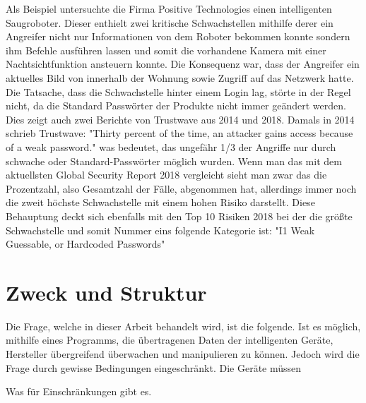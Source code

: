 Als Beispiel untersuchte die Firma Positive Technologies einen intelligenten Saugroboter.
Dieser enthielt zwei kritische Schwachstellen mithilfe derer ein Angreifer nicht nur Informationen von dem Roboter bekommen konnte sondern ihm Befehle ausführen lassen und somit die vorhandene Kamera mit einer Nachtsichtfunktion ansteuern konnte. Die Konsequenz war, dass der Angreifer ein aktuelles Bild von innerhalb der Wohnung sowie Zugriff auf das Netzwerk hatte. Die Tatsache, dass die Schwachstelle hinter einem Login lag, störte in der Regel nicht, da die Standard Passwörter der Produkte nicht immer geändert werden.
Dies zeigt auch zwei Berichte von Trustwave aus 2014 und 2018.
Damals in 2014 schrieb Trustwave: "Thirty percent of the time, an attacker gains access because of a weak password."
was bedeutet, das ungefähr 1/3 der Angriffe nur durch schwache oder Standard-Passwörter möglich wurden. Wenn man das mit dem aktuellsten Global Security Report 2018 vergleicht sieht man zwar das die Prozentzahl, also Gesamtzahl der Fälle, abgenommen hat, allerdings immer noch die zweit höchste Schwachstelle mit einem hohen Risiko darstellt.
Diese Behauptung deckt sich ebenfalls mit den Top 10 Risiken 2018 bei der die größte Schwachstelle und somit Nummer eins folgende Kategorie ist: "I1 Weak Guessable, or Hardcoded Passwords" %


\section{Zweck und Struktur}
    Die Frage, welche in dieser Arbeit behandelt wird, ist die folgende.
    Ist es möglich, mithilfe eines Programms, die übertragenen Daten der intelligenten Geräte, Hersteller übergreifend überwachen und manipulieren zu können.
    Jedoch wird die Frage durch gewisse Bedingungen eingeschränkt.
    Die Geräte müssen 
    
    Was für Einschränkungen gibt es.
    
